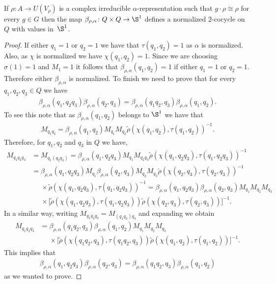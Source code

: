 \begin{Lem}\label{twistedcocycle}
If $\rho\colon A \rightarrow U(V_{\rho})$ is a complex
irreducible $\alpha$-representation such that $g\cdot \rho\cong \rho$ for every
$g\in G$ then the map $\beta_{\rho,\alpha}\colon Q\times Q\rightarrow \S^{1}$ defines a
normalized $2$-cocycle on $Q$ with values in~$\S^{1}$.
\end{Lem}

\begin{proof}
If either $q_{1}=1$ or $q_{2}=1$ we have that $\tau(q_{1},q_{2})=1$ as $\alpha$ is normalized.
Also, as $\chi$ is normalized we have $\chi(q_{1},q_{2})=1$. Since we are choosing
$\sigma(1)=1$ and $M_{1}=1$ it follows that $\beta_{\rho,\alpha}(q_{1},q_{2})=1$ if either
$q_{1}=1$ or $q_{2}=1$. Therefore either $\beta_{\rho,\alpha}$ is normalized. To finish we need
to prove that for every $q_{1},q_{2},q_{3}\in Q$ we have
\begin{gather*}
\beta_{\rho,\alpha}(q_{1},q_{2}q_{3})\beta_{\rho,\alpha}(q_{2},q_{3})
=\beta_{\rho,\alpha}(q_{1}q_{2},q_{3})\beta_{\rho,\alpha}(q_{1},q_{2}).
\end{gather*}
To see this note that as $\beta_{\rho,\alpha}(q_{1},q_{2})$ belongs to $\S^{1}$ we
have that
\begin{gather*}
M_{q_{1}q_{2}}
=\beta_{\rho,\alpha}(q_{1},q_{2})M_{q_{1}}M_{q_{2}}
\tilde{\rho}(\chi(q_{1},q_{2}),\tau(q_{1},q_{2}))^{-1}.
\end{gather*}
Therefore, for $q_1, q_2$ and $q_3$ in $Q$ we have,
\begin{align*}
M_{q_{1}q_{2}q_{3}}&=M_{q_{1}(q_{2}q_{3})}
=\beta_{\rho,\alpha}(q_{1},q_{2}q_{3})M_{q_{1}}
M_{q_{2}q_{3}}\tilde{\rho}(\chi(q_{1},q_{2}q_{3}),\tau(q_{1},q_{2}q_{3}))^{-1}
\\
&=\beta_{\rho,\alpha}(q_{1},q_{2}q_{3})M_{q_{1}}
\beta_{\rho,\alpha}(q_{2},q_{3})M_{q_{2}}M_{q_{3}}
\tilde{\rho}(\chi(q_{2},q_{3}),\tau(q_{2},q_{3}))^{-1}
\\
&\phantom{=}\times\tilde{\rho}(\chi(q_{1},q_{2}q_{3}),
\tau(q_{1},q_{2}q_{3}))^{-1}
=\beta_{\rho,\alpha}(q_{1},q_{2}q_{3})\beta_{\rho,\alpha}(q_{2},q_{3})M_{q_{1}}M_{q_{2}}M_{q_{3}}
\\
&\phantom{=}\times\big[\tilde{\rho}(\chi(q_{1},q_{2}q_{3}),\tau(q_{1},q_{2}q_{3}))
\tilde{\rho}(\chi(q_{2},q_{3}),\tau(q_{2},q_{3}))\big]^{-1}.
\end{align*}
In a similar way, writing $M_{q_{1}q_{2}q_{3}}=M_{(q_{1}q_{2})q_{3}}$ and expanding we obtain
\begin{align*}
M_{q_{1}q_{2}q_{3}}&=\beta_{\rho,\alpha}(q_{1}q_{2},q_{3})
\beta_{\rho,\alpha}(q_{1},q_{2})M_{q_{1}}M_{q_{2}}M_{q_{3}}
\\
&\phantom{=}\times\big[\tilde{\rho}(\chi(q_{1}q_{2},q_{3}),\tau(q_{1}q_{2},q_{3}))
\tilde{\rho}(\chi(q_{1},q_{2}),\tau(q_{1},q_{2}))\big]^{-1}.
\end{align*}	
This implies that
\begin{gather*}
\beta_{\rho,\alpha}(q_{1},q_{2}q_{3})\beta_{\rho,\alpha}(q_{2},q_{3})
=\beta_{\rho,\alpha}(q_{1}q_{2},q_{3})\beta_{\rho,\alpha}(q_{1},q_{2})
\end{gather*}
as we wanted to prove.
\end{proof}

